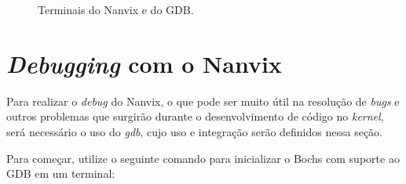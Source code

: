 \documentclass[11pt]{article}
\begin{document}
\begin{figure}[t]
	\centering
	\qquad
\caption{Terminais do Nanvix e do GDB.}
\end{figure}

\section{\textit{Debugging} com o Nanvix}

Para realizar o \textit{debug} do Nanvix, o que pode ser muito útil na resolução de \textit{bugs} e outros problemas que surgirão durante o desenvolvimento de código no \textit{kernel}, será necessário o uso do \textit{gdb}, cujo uso e integração serão definidos nessa seção.

Para começar, utilize o seguinte comando para inicializar o Bochs com suporte ao GDB em um terminal: \\
\end{document}
